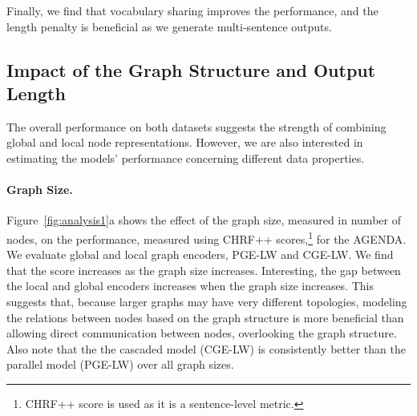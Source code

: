 \documentclass[11pt,a4paper]{article}
\begin{document}
Finally, we find that vocabulary sharing improves the performance, and the length penalty is beneficial as we generate multi-sentence outputs.














\subsection{Impact of the Graph Structure and Output Length}
\label{sec:outputlength}
The overall performance on both datasets suggests the strength of combining global and local node representations. However, we are also interested in estimating the models' performance concerning different data properties.
\paragraph{Graph Size.} Figure~\ref{fig:analysis1}a shows the effect of the graph size, measured in number of nodes, on the performance, measured using CHRF++ scores,\footnote{CHRF++ score is used as it is a sentence-level metric.} for the AGENDA. We evaluate global and local graph encoders, {\selectfont PGE-LW} and {\selectfont CGE-LW}. We find that the score increases as the graph size increases. Interesting, the gap between the local and global encoders increases when the graph size increases. This suggests that, because larger graphs may have very different topologies, modeling the relations between nodes based on the graph structure is more beneficial than allowing direct communication between nodes, overlooking the graph structure. Also note that the the cascaded model ({\selectfont CGE-LW}) is consistently better than the parallel model ({\selectfont PGE-LW}) over all graph sizes.
\end{document}
